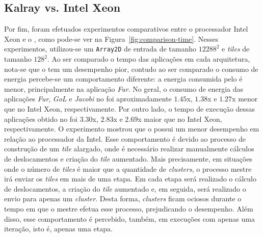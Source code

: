 \subsection{Kalray \mppa vs. Intel Xeon}


Por fim, foram efetuados experimentos comparativos entre o processador Intel
Xeon e o \mppa, como pode-se ver na Figura~\ref{fig:comparison-time}. Nesses
experimentos, utilizou-se um \texttt{Array2D} de entrada de tamanho $12288^2$ e
\textit{tiles} de tamanho $128^2$. Ao ser comparado o tempo das aplicações em
cada arquitetura, nota-se que o \mppa tem um desempenho pior, contudo ao ser
comparado o consumo de energia percebe-se um comportamento diferente: a energia
consumida pelo \mppa é menor, principalmente na aplicação \textit{Fur}. No
geral, o consumo de energia das aplicações \textit{Fur}, \textit{GoL} e
\textit{Jacobi} no \mppa foi aproximadamente $1.45$x, $1.38$x e $1.27$x menor
que no Intel Xeon, respectivamente. Por outro lado, o tempo de execução dessas
aplicações obtido no \mppa foi  $3.30$x, $2.83$x e $2.69$x maior que no Intel
Xeon, respectivamente. O experimento mostrou que o \mppa possui
um menor desempenho em relação ao processador da Intel. Esse comportamento é
devido ao processo de construção de um \textit{tile} alargado, onde é necessário
realizar manualmente cálculos de deslocamentos e criação do \textit{tile}
aumentado. Mais precisamente, em situações onde o número
de \textit{tiles} é maior que a quantidade de \textit{clusters}, o processo
mestre irá enviar os \textit{tiles} em mais de uma etapa. Em cada etapa será
realizado o cálculo de deslocamentos, a criação do \textit{tile} aumentado e,
em seguida, será realizado o envio para apenas um \textit{cluster}. Desta forma,
\textit{clusters} ficam ociosos durante o tempo em que o mestre efetua
esse processo, prejudicando o desempenho. Além disso, esse comportamento é
percebido, também, em execuções com apenas uma iteração, isto é, apenas uma etapa.



